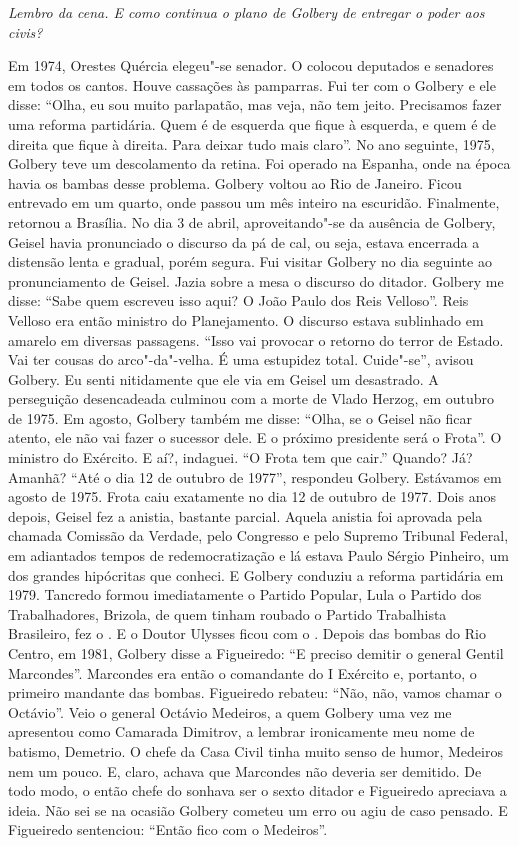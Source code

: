\itshape
 Lembro da cena. E como continua o plano de Golbery de
entregar o poder aos civis?

\normalfont 
Em 1974, Orestes Quércia elegeu"-se senador. O  colocou
deputados e senadores em todos os cantos. Houve cassações às pamparras.
Fui ter com o Golbery e ele disse: ``Olha, eu sou muito parlapatão, mas
veja, não tem jeito. Precisamos fazer uma reforma partidária. Quem é de
esquerda que fique à esquerda, e quem é de direita que fique à direita.
Para deixar tudo mais claro''. No ano seguinte, 1975, Golbery teve um
descolamento da retina. Foi operado na Espanha, onde na época havia os
bambas desse problema. Golbery voltou ao Rio de Janeiro. Ficou entrevado
em um quarto, onde passou um mês inteiro na escuridão. Finalmente,
retornou a Brasília. No dia 3 de abril, aproveitando"-se da ausência de
Golbery, Geisel havia pronunciado o discurso da pá de cal, ou seja,
estava encerrada a distensão lenta e gradual, porém segura. Fui visitar
Golbery no dia seguinte ao pronunciamento de Geisel. Jazia sobre a mesa
o discurso do ditador. Golbery me disse: ``Sabe quem escreveu isso aqui?
O João Paulo dos Reis Velloso''. Reis Velloso era então ministro do
Planejamento. O discurso estava sublinhado em amarelo em diversas
passagens. ``Isso vai provocar o retorno do terror de Estado. Vai ter
cousas do arco"-da"-velha. É uma estupidez total. Cuide"-se'', avisou
Golbery. Eu senti nitidamente que ele via em Geisel um desastrado. A
perseguição desencadeada culminou com a morte de Vlado Herzog, em
outubro de 1975. Em agosto, Golbery também me disse: ``Olha, se o Geisel
não ficar atento, ele não vai fazer o sucessor dele. E o próximo
presidente será o Frota''. O ministro do Exército. E aí?, indaguei. ``O
Frota tem que cair.'' Quando? Já? Amanhã? ``Até o dia 12 de outubro de
1977'', respondeu Golbery. Estávamos em agosto de 1975. Frota caiu
exatamente no dia 12 de outubro de 1977. Dois anos depois, Geisel fez a
anistia, bastante parcial. Aquela anistia foi aprovada pela chamada
Comissão da Verdade, pelo Congresso e pelo Supremo Tribunal Federal, em
adiantados tempos de redemocratização e lá estava Paulo Sérgio Pinheiro,
um dos grandes hipócritas que conheci. E Golbery conduziu a reforma
partidária em 1979. Tancredo formou imediatamente o Partido Popular,
Lula o Partido dos Trabalhadores, Brizola, de quem tinham roubado o
Partido Trabalhista Brasileiro, fez o . E o Doutor Ulysses ficou com
o . Depois das bombas do Rio Centro, em 1981, Golbery disse a
Figueiredo: ``E preciso demitir o general Gentil Marcondes''. Marcondes
era então o comandante do I Exército e, portanto, o primeiro mandante
das bombas. Figueiredo rebateu: ``Não, não, vamos chamar o Octávio''.
Veio o general Octávio Medeiros, a quem Golbery uma vez me apresentou
como Camarada Dimitrov, a lembrar ironicamente meu nome de batismo,
Demetrio. O chefe da Casa Civil tinha muito senso de humor, Medeiros nem
um pouco. E, claro, achava que Marcondes não deveria ser demitido. De
todo modo, o então chefe do  sonhava ser o sexto ditador e Figueiredo
apreciava a ideia. Não sei se na ocasião Golbery cometeu um erro ou agiu
de caso pensado. E Figueiredo sentenciou: ``Então fico com o Medeiros''.

